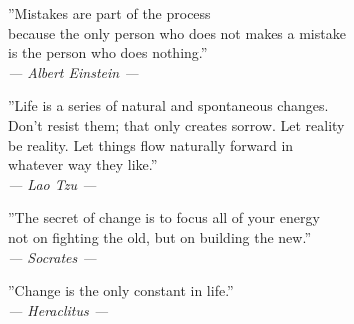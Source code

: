 \thispagestyle{plain}
\begin{center}
''Mistakes are part of the process\\
because the only person who does not makes a mistake\\
is the person who does nothing.''\\

\textit{--- Albert Einstein ---}
\end{center}

\begin{center}
''Life is a series of natural and spontaneous changes. \\
Don't resist them; that only creates sorrow. Let reality \\
be reality. Let things flow naturally forward in \\
whatever way they like.''\\

\textit{--- Lao Tzu ---}
\end{center}

\begin{center}
''The secret of change is to focus all of your energy \\
not on fighting the old, but on building the new.''\\

\textit{--- Socrates ---}
\end{center}

\begin{center}
''Change is the only constant in life.''\\

\textit{--- Heraclitus ---}
\end{center}